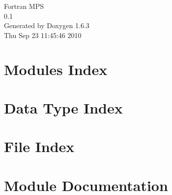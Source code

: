 \documentclass[a4paper]{book}
\begin{document}
\hypersetup{pageanchor=false}
\begin{titlepage}
\vspace*{7cm}
\begin{center}
{\Large Fortran MPS \\[1ex]\large 0.1 }\\
\vspace*{1cm}
{\large Generated by Doxygen 1.6.3}\\
\vspace*{0.5cm}
{\small Thu Sep 23 11:45:46 2010}\\
\end{center}
\end{titlepage}
\clearemptydoublepage
{}
\tableofcontents
\clearemptydoublepage
{}
\hypersetup{pageanchor=true}
\chapter{Modules Index}

\chapter{Data Type Index}

\chapter{File Index}

\chapter{Module Documentation}

















\end{document}
